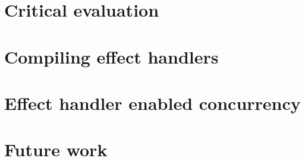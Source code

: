 \documentclass[mscres,cdtppar,twoside,openright,logo,rightchapter,normalheadings]{infthesis}
\theoremstyle{definition}
\begin{document}
\section{Critical evaluation}
\label{sec:criticaleval}

\section{Compiling effect handlers}
\label{sec:conclude-compiling}

\section{Effect handler enabled concurrency}
\label{sec:conclude-concurrency}

\section{Future work}
\label{sec:futurework}



%

\nocite{*}
\singlespace



\end{document}
